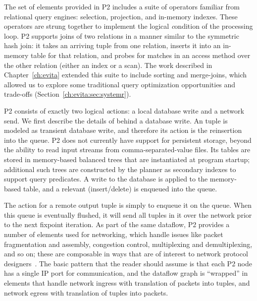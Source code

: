 The set of elements provided in P2 includes a suite of operators familiar from
relational query engines: selection, projection, and in-memory indexes.  These
operators are strung together to implement the logical {\emph condition} of the 
processing loop.  P2 supports joins of two relations in a manner similar to the
symmetric hash join: it takes an arriving tuple from one relation, inserts it
into an in-memory table for that relation, and probes for matches in an access
method over the other relation (either an index or a scan).  The work described
in Chapter~\ref{ch:evita} extended this suite to include sorting and
merge-joins, which allowed us to explore some traditional query optimization
opportunities and trade-offs (Section~\ref{ch:evita:sec:systemr}).

P2 consists of exactly two logical {\emph actions}: a local database write and
a network send.  We first describe the details of behind a database write.  An
 tuple is modeled as transient database write, and therefore its
action is the reinsertion into the  queue.  P2 does not currently
have support for persistent storage, beyond the ability to read input streams
from comma-separated-value files.  Its tables are stored in memory-based
balanced trees that are instantiated at program startup; additional such trees
are constructed by the planner as secondary indexes to support query
predicates.  A write to the database is applied to the memory-based table, and
a relevant (insert/delete)  is enqueued into the  queue.

The action for a remote output tuple is simply to enqueue it on the 
queue.  When this queue is eventually flushed, it will send all tuples in it
over the network prior to the next fixpoint iteration.  As part of the same
dataflow, P2 provides a number of elements used for networking, which handle
issues like packet fragmentation and assembly, congestion control, multiplexing
and demultiplexing, and so on; these are composable in ways that are of
interest to network protocol designers~\cite{condie-hotnets05}.  The basic
pattern that the reader should assume is that each P2 node has a single IP port
for communication, and the dataflow graph is ``wrapped'' in elements that
handle network ingress with translation of packets into tuples, and network
egress with translation of tuples into packets.


